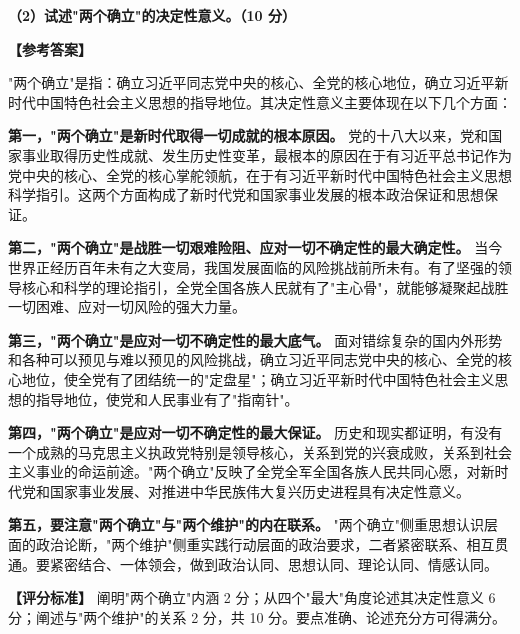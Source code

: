 \documentclass[12pt, a4paper]{article}
\begin{document}
\begin{answerbox}
\textbf{（2）试述"两个确立"的决定性意义。（10 分）}

\textbf{【参考答案】}

"两个确立"是指：确立习近平同志党中央的核心、全党的核心地位，确立习近平新时代中国特色社会主义思想的指导地位。其决定性意义主要体现在以下几个方面：

\textbf{第一，"两个确立"是新时代取得一切成就的根本原因。} 党的十八大以来，党和国家事业取得历史性成就、发生历史性变革，最根本的原因在于有习近平总书记作为党中央的核心、全党的核心掌舵领航，在于有习近平新时代中国特色社会主义思想科学指引。这两个方面构成了新时代党和国家事业发展的根本政治保证和思想保证。

\textbf{第二，"两个确立"是战胜一切艰难险阻、应对一切不确定性的最大确定性。} 当今世界正经历百年未有之大变局，我国发展面临的风险挑战前所未有。有了坚强的领导核心和科学的理论指引，全党全国各族人民就有了"主心骨"，就能够凝聚起战胜一切困难、应对一切风险的强大力量。

\textbf{第三，"两个确立"是应对一切不确定性的最大底气。} 面对错综复杂的国内外形势和各种可以预见与难以预见的风险挑战，确立习近平同志党中央的核心、全党的核心地位，使全党有了团结统一的"定盘星"；确立习近平新时代中国特色社会主义思想的指导地位，使党和人民事业有了"指南针"。

\textbf{第四，"两个确立"是应对一切不确定性的最大保证。} 历史和现实都证明，有没有一个成熟的马克思主义执政党特别是领导核心，关系到党的兴衰成败，关系到社会主义事业的命运前途。"两个确立"反映了全党全军全国各族人民共同心愿，对新时代党和国家事业发展、对推进中华民族伟大复兴历史进程具有决定性意义。

\textbf{第五，要注意"两个确立"与"两个维护"的内在联系。} "两个确立"侧重思想认识层面的政治论断，"两个维护"侧重实践行动层面的政治要求，二者紧密联系、相互贯通。要紧密结合、一体领会，做到政治认同、思想认同、理论认同、情感认同。

\textbf{【评分标准】} 阐明"两个确立"内涵 2 分；从四个"最大"角度论述其决定性意义 6 分；阐述与"两个维护"的关系 2 分，共 10 分。要点准确、论述充分方可得满分。
\end{answerbox}
\end{document}
